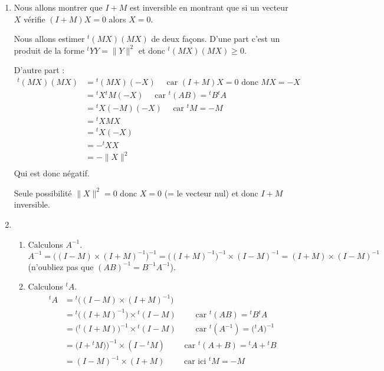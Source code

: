 \documentclass[11pt,a4paper]{article}
\renewcommand{\ge}{\geqslant} \renewcommand{\geq}{\geqslant}
\begin{document}
\begin{enumerate}
  \item Nous allons montrer que $I+M$ est inversible en montrant que si un vecteur $X$ vérifie
$(I+M)X = 0$ alors $X=0$.

Nous allons estimer ${}^t\!(MX)(MX)$ de deux façons.
D'une part c'est un produit de la forme ${}^t\!Y Y = \| Y\|^2$ et donc ${}^t\!(MX)(MX) \ge 0$.

D'autre part :
\begin{align*}
{}^t\!(MX)(MX) 
 & = {}^t\!(MX) (-X) \quad \text{ car } (I+M)X = 0 \text{ donc } MX = -X \\
 & = {}^t\!X {}^t\!M (-X)    \quad \text{ car } {}^t\!(AB)={}^t\! B {}^t\!A \\
 & = {}^t\!X (-M) (-X)    \quad \text{ car } {}^t\!M=-M \\
 & = {}^t\!X MX \\
 & = {}^t\!X (-X) \\
 & = -{}^t\!XX \\
 & = - \|X\|^2 \\
\end{align*}
Qui est donc négatif.

Seule possibilité $\|X\|^2=0$ donc $X=0$ (= le vecteur nul) et donc $I+M$ inversible.

\item 
  \begin{enumerate}
    \item Calculons $A^{-1}$.
$$A^{-1} =\big( (I-M)\times(I+M)^{-1} \big)^{-1} = \big( (I+M)^{-1} \big)^{-1} \times(I-M)^{-1} = (I+M)\times(I-M)^{-1}$$
(n'oubliez pas que $(AB)^{-1}=B^{-1}A^{-1}$).


     \item Calculons ${}^t\!A$.
\begin{align*}
{}^t\!A 
  & = {}^t\!\big( (I-M) \times (I+M)^{-1} \big) \\
  & = {}^t\!\big( (I+M)^{-1} \big) \times {}^t\!(I-M) \qquad \text{ car } {}^t\!(AB)={}^t\!B{}^t\!A \\
  & = \big( {}^t\!(I+M) \big)^{-1}\times{}^t\!(I-M) \qquad \text{ car } {}^t\!(A^{-1})=\big({}^tA\big)^{-1} \\
  & = \big( I+{}^t\!M) \big)^{-1}\times(I-{}^t\!M) \qquad \text{ car } {}^t\!(A+B)={}^t\!A+{}^t\!B \\
  & = (I-M) ^{-1}\times (I+M) \qquad \text{ car ici } {}^{t}\!{M} = -M \\  
\end{align*}


\end{enumerate}
\end{enumerate}
\end{document}
